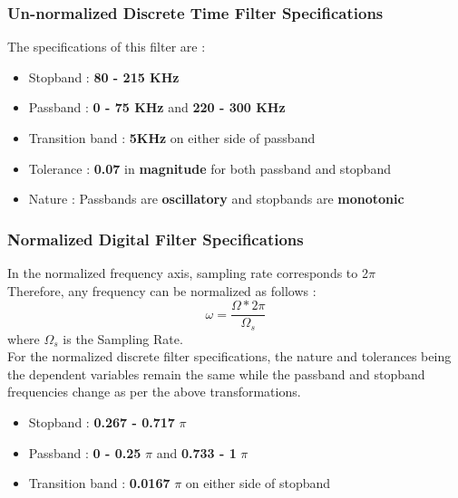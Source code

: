 \documentclass{article}
\begin{document}
\subsubsection{\textbf{Un-normalized Discrete Time Filter Specifications}}

\noindent
The specifications of this filter are :
\begin{itemize}
    \item Stopband : \textbf{80 - 215 KHz}
    \item Passband : \textbf{0 - 75 KHz} and \textbf{220 - 300 KHz}
    \item  Transition band : \textbf{5KHz} on either side of passband
    \item  Tolerance : \textbf{0.07} in \textbf{magnitude} for both passband and stopband
    \item  Nature : Passbands are \textbf{oscillatory} and stopbands are \textbf{monotonic}
\end{itemize}

\subsubsection{Normalized Digital Filter Specifications}

In the normalized frequency axis, sampling rate corresponds to 2$\pi$\\
Therefore, any frequency can be normalized as follows :
\begin{equation*}
    \omega = \frac{\Omega*2\pi}{\Omega_s}
\end{equation*}
where $\Omega_s$ is the Sampling Rate.\\

\vspace{1em}
\noindent
For the normalized discrete filter specifications, the nature and tolerances being the dependent variables remain the same while the passband and stopband frequencies change as per the above transformations. 
\begin{itemize}
    \item Stopband : \textbf{0.267 - 0.717} {$\pi$}
    \item Passband : \textbf{0 -  0.25} {$\pi$} and \textbf{0.733 - 1} {$\pi$}
    \item  Transition band : \textbf{0.0167} $\pi$ on either side of stopband
\end{itemize}
\end{document}
